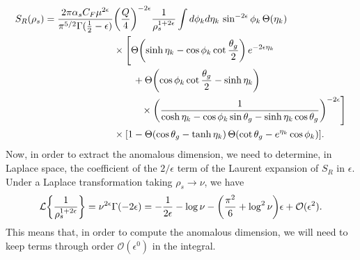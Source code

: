 \documentclass[../thesis.tex]{subfiles}
\providecommand{\cL}{\mathcal{L}}
\providecommand{\cO}{\mathcal{O}}
\begin{document}
	\begin{equation}\label{app_soft-eq:soft integral without kperp}
	\begin{aligned}
		S_R(\rho_s) = \frac{2\pi\alpha_s C_F\mu^{2\epsilon}}{\pi^{5/2} \Gamma(\frac{1}{2} - \epsilon)} &\qty(\frac{Q}{4})^{-2\epsilon} \frac{1}{\rho_s^{1+2\epsilon}} \int d\phi_k d\eta_k\, \sin^{-2\epsilon}\phi_k \, \Theta(\eta_k) \\
		&\times \Bigg[ \Theta\qty(\sinh\eta_k - \cos\phi_k\cot\frac{\theta_g}{2})\,e^{-2\epsilon\eta_k} \\
			&\qquad+ \Theta\qty(\cos\phi_k\cot\frac{\theta_g}{2} - \sinh\eta_k)\\
			&\hspace{1cm}\times \qty(\frac{1}{\cosh\eta_k - \cos\phi_k\sin\theta_g - \sinh\eta_k\cos\theta_g})^{-2\epsilon}\Bigg] \\
			&\times \qty[1 - \Theta(\cos\theta_g - \tanh\eta_k)\,\Theta\qty(\cot\theta_g - e^{\eta_k}\cos\phi_k)].
	\end{aligned}
	\end{equation}
	Now, in order to extract the anomalous dimension, we need to determine, in Laplace space, the coefficient of the $2/\epsilon$ term of the Laurent expansion of $S_R$ in $\epsilon$. Under a Laplace transformation taking $\rho_s \to \nu$, we have
	\begin{equation}
		\cL\qty{\frac{1}{\rho_s^{1 + 2\epsilon}}} = \nu^{2\epsilon} \Gamma(-2\epsilon) = -\frac{1}{2\epsilon} - \log\nu - \qty(\frac{\pi^2}{6} + \log^2\nu)\epsilon + \cO(\epsilon^2).
	\end{equation}
	This means that, in order to compute the anomalous dimension, we will need to keep terms through order $\cO(\epsilon^0)$ in the integral.
\end{document}
